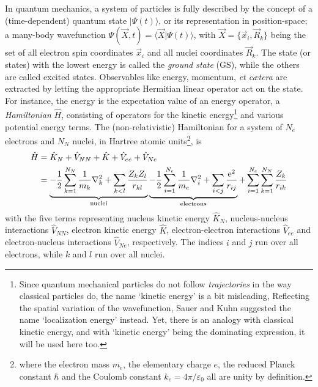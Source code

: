 \documentclass[11pt,bibliography=totoc,index=totoc]{scrbook}   %
\newcommand{\comment}[1]{\hl{#1}}
\begin{document}

In quantum mechanics, a system of particles is fully described by the concept of a (time-dependent) quantum state $|\Psi(t)\rangle$, 
or its representation in position-space; a many-body wavefunction $\Psi(\vec{X},t)=\langle\vec{X}|\Psi(t)\rangle$, with $\vec{X}=\{\vec{x}_i,\vec{R}_k\}$ being the set of all electron spin coordinates $\vec{x}_i$ and all nuclei coordinates $\vec{R}_k$.
The state (or states) with the lowest energy is called the \emph{ground state} (GS), while the others are called excited states. 
Observables like energy, momentum, \textit{et cætera} are extracted by letting the appropriate Hermitian linear operator act on the state. 
For instance, the energy is the expectation value of an energy operator, a \emph{Hamiltonian} $\hat{H}$, 
consisting of operators for the kinetic energy\footnote{Since quantum mechanical particles do not follow \emph{trajectories} in the way classical particles do, the name `kinetic energy' is a bit misleading, Reflecting the spatial variation of the wavefunction, Sauer and Kuhn suggested the name `localization energy' instead\cite{Sauer:1982}. Yet, there is an analogy with classical kinetic energy, and with `kinetic energy' being the dominating expression, it will be used here too.} and various potential energy terms.
The (non-relativistic) Hamiltonian for a system of $N_e$ electrons and $N_N$ nuclei, in Hartree atomic units\footnote{
where the electron mass $m_e$, the elementary charge $e$, the reduced Planck constant $\hbar$ and the Coulomb constant $k_e=4\pi/\varepsilon_0$ all are unity by definition.
}, is
\begin{align}
  \hat{H} &= \hat{K}_N + \hat{V}_{NN} + \hat{K} + \hat{V}_{ee} + \hat{V}_{Ne}\\
    &= \underbrace{
        - \frac{1}{2}\sum_{k=1}^{N_N} \frac{1}{m_k}\nabla_k^2 
        + \sum_{k<l}\frac{Z_kZ_l}{r_{kl}}
		}_{\text{nuclei}}
  \underbrace{
      -\frac{1}{2}\sum_{i=1}^{N_e}\frac{1}{m_e}\nabla_i^2
	+ \sum_{i<j}\frac{\mathrm{e}^2}{r_{ij}}
	}_{\text{electrons}}
    + \sum_{i=1}^{N_e}\sum_{k=1}^{N_N} \frac{Z_k}{r_{ik}}
  \label{eq:mol-hamiltonian}
\end{align}
with the five terms representing nucleus kinetic energy $\hat{K}_N$, nucleus-nucleus interactions $\hat{V}_{NN}$, electron kinetic energy $\hat{K}$, electron-electron interactions $\hat{V}_{ee}$ and electron-nucleus interactions $\hat{V}_{Ne}$, respectively.
The indices $i$ and $j$ run over all electrons, while $k$ and $l$ run over all nuclei. 
\end{document}
